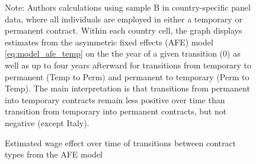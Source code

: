 \begin{figure}
    \caption{Estimated wage effect over time of transitions between contract types from the AFE model}
    \label{graph_contyp_post}
    \footnotesize{Note: Authors calculations using sample B in country-specific panel data, where all individuals are employed in either a temporary or permanent contract.  Within each country cell, the graph displays estimates from the asymmetric fixed effects (AFE) model \ref{eq:model_afe_temp} on the the year of a given transition (0) as well as up to four years afterward for transitions from temporary to permanent (Temp to Perm) and permanent to temporary (Perm to Temp).  The main interpretation is that transitions from permanent into temporary contracts remain less positive over time than transition from temporary into permanent contracts, but not negative (except Italy).}
\end{figure}

